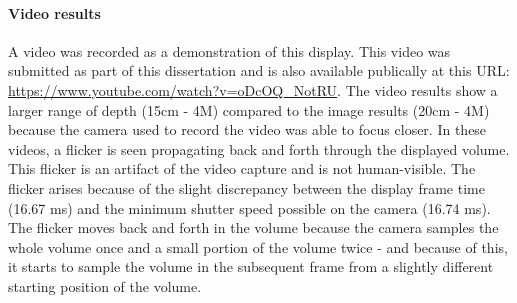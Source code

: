 \paragraph{Video results}
A video was recorded as a demonstration of this display. This video was submitted as part of this dissertation and is also available publically at this URL: \url{https://www.youtube.com/watch?v=oDcOQ_NotRU}. 
The video results show a larger range of depth (15cm - 4M) compared to the image results (20cm - 4M) because the camera used to record the video was able to focus closer. In these videos, a flicker is seen propagating back and forth through the displayed volume. This flicker is an artifact of the video capture and is not human-visible. The flicker arises because of the slight discrepancy between the display frame time (16.67 ms) and the minimum shutter speed possible on the camera (16.74 ms). The flicker moves back and forth in the volume because the camera samples the whole volume once and a small portion of the volume twice - and because of this, it starts to sample the volume in the subsequent frame from a slightly different starting position of the volume. 


